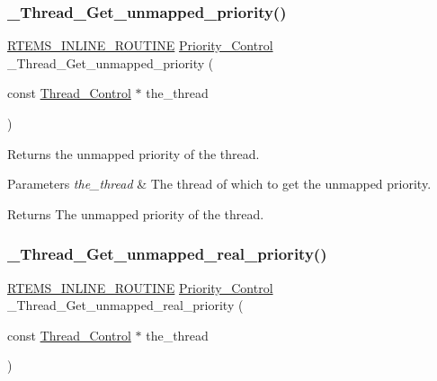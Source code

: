 \subsubsection{\texorpdfstring{\_Thread\_Get\_unmapped\_priority()}{\_Thread\_Get\_unmapped\_priority()}}
{\footnotesize\ttfamily \mbox{\hyperlink{group__RTEMSScoreBaseDefs_gac216239df231d5dbd15e3520b0b9313f}{R\+T\+E\+M\+S\+\_\+\+I\+N\+L\+I\+N\+E\+\_\+\+R\+O\+U\+T\+I\+NE}} \mbox{\hyperlink{group__RTEMSScorePriority_ga59d02b58072d31a9a1cfe644557aefe2}{Priority\+\_\+\+Control}} \+\_\+\+Thread\+\_\+\+Get\+\_\+unmapped\+\_\+priority (\begin{DoxyParamCaption}\item[{const \mbox{\hyperlink{struct__Thread__Control}{Thread\+\_\+\+Control}} $\ast$}]{the\+\_\+thread }\end{DoxyParamCaption})}



Returns the unmapped priority of the thread. 


\begin{DoxyParams}{Parameters}
{\em the\+\_\+thread} & The thread of which to get the unmapped priority.\\
\hline
\end{DoxyParams}
\begin{DoxyReturn}{Returns}
The unmapped priority of the thread. 
\end{DoxyReturn}
\mbox{\label{group__RTEMSScoreThread_ga3e830e160eb3f7511ae2cab7b11023a8}} 
\subsubsection{\texorpdfstring{\_Thread\_Get\_unmapped\_real\_priority()}{\_Thread\_Get\_unmapped\_real\_priority()}}
{\footnotesize\ttfamily \mbox{\hyperlink{group__RTEMSScoreBaseDefs_gac216239df231d5dbd15e3520b0b9313f}{R\+T\+E\+M\+S\+\_\+\+I\+N\+L\+I\+N\+E\+\_\+\+R\+O\+U\+T\+I\+NE}} \mbox{\hyperlink{group__RTEMSScorePriority_ga59d02b58072d31a9a1cfe644557aefe2}{Priority\+\_\+\+Control}} \+\_\+\+Thread\+\_\+\+Get\+\_\+unmapped\+\_\+real\+\_\+priority (\begin{DoxyParamCaption}\item[{const \mbox{\hyperlink{struct__Thread__Control}{Thread\+\_\+\+Control}} $\ast$}]{the\+\_\+thread }\end{DoxyParamCaption})}



